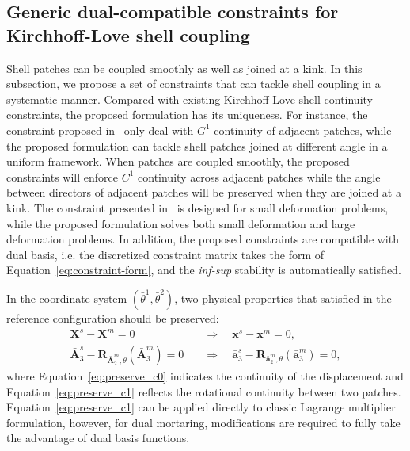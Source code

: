 \subsection{Generic dual-compatible constraints for Kirchhoff-Love shell coupling}

Shell patches can be coupled smoothly as well as joined at a kink. In this subsection, we propose a set of constraints that can tackle shell coupling in a systematic manner. Compared with existing Kirchhoff-Love shell continuity constraints, the proposed formulation has its uniqueness. For instance, the constraint proposed in~\cite{schuss2019multi} only deal with $G^1$ continuity of adjacent patches, while the proposed formulation can tackle shell patches joined at different angle in a uniform framework. When patches are coupled smoothly, the proposed constraints will enforce $C^1$ continuity across adjacent patches while the angle between directors of adjacent patches will be preserved when they are joined at a kink. The constraint presented in~\cite{coox_robust_2017, hirschler2019embedded} is designed for small deformation problems, while the proposed formulation solves both small deformation and large deformation problems. In addition, the proposed constraints are compatible with dual basis, i.e. the discretized constraint matrix takes the form of Equation~\eqref{eq:constraint-form}, and the \textit{inf-sup} stability is automatically satisfied.\par

In the coordinate system $(\bar{\theta}^1, \bar{\theta}^2)$, two physical properties that satisfied in the reference configuration should be preserved:
\begin{subequations}
	\begin{align}
		\mathbf{X}^s-\mathbf{X}^m=0\quad                                                              & \Rightarrow\quad \mathbf{x}^s-\mathbf{x}^m=0,\label{eq:preserve_c0}                                                               \\
		\bar{\mathbf{A}}^s_3 - \mathbf{R}_{\bar{\mathbf{A}}^m_2,\theta}(\bar{\mathbf{A}}^m_3)=0 \quad & \Rightarrow\quad \bar{\mathbf{a}}^s_3 - \mathbf{R}_{\bar{\mathbf{a}}^m_2,\theta}(\bar{\mathbf{a}}^m_3) = 0,\label{eq:preserve_c1}
	\end{align}
\end{subequations}
where Equation~\eqref{eq:preserve_c0} indicates the continuity of the displacement and Equation~\eqref{eq:preserve_c1} reflects the rotational continuity between two patches. Equation~\eqref{eq:preserve_c1} can be applied directly to classic Lagrange multiplier formulation, however, for dual mortaring, modifications are required to fully take the advantage of dual basis functions.\par

